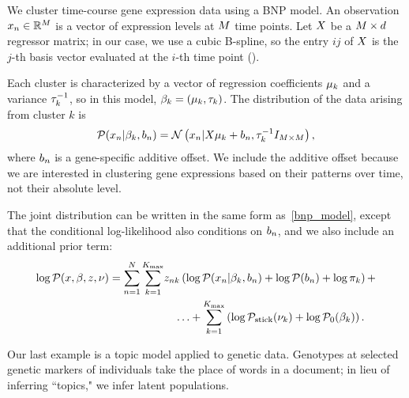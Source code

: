 \begin{ex}
We cluster time-course gene expression data using a BNP model.
An observation $x_n\in\mathbb{R}^M$ is a vector of expression levels at $M$
time points.
Let $X$ be a $M \times d$ regressor matrix;
in our case, we use a cubic B-spline, so the entry $ij$ of $X$
is the $j$-th basis vector evaluated at the $i$-th time point (\secref{}).

Each cluster is characterized by a vector of regression coefficients
$\mu_k$ and a variance $\tau^{-1}_k$, so
in this model, $\beta_k = (\mu_k, \tau_k)$.
The distribution of the data arising from cluster $k$ is
\begin{align*}
\mathcal{P}(x_n | \beta_k, b_n) =
\mathcal{N}\left(x_n | X\mu_k + b_n,
\tau_k^{-1}I_{M \times M}\right),
\end{align*}
%
where $b_{n}$ is a gene-specific additive offset.
We include the additive offset because we
are interested in clustering gene expressions based on their patterns over time,
not their absolute level.

The joint distribution can be written in the same form as~\eqref{bnp_model},
except that the conditional log-likelihood also conditions on $b_n$,
and we also include an additional prior term:
\begin{align*}
\log \mathcal{P}(x, \beta, z, \nu) =
    \sum_{n=1}^N \sum_{k=1}^{{K_{\mathrm{max}}}}&
        z_{nk} \left(
            \log \mathcal{P}(x_n \vert \beta_k, b_n) + \log \mathcal{P}(b_n) + \log \pi_k
        \right) +\notag \\
    & \quad \ldots + \sum_{k=1}^{{K_{\mathrm{max}}}} \left(
        \log \mathcal{P}_{\mathrm{stick}}(\nu_{k}) + \log \mathcal{P}_{0}(\beta_k)
    \right).
\end{align*}

\end{ex}


Our last example is a topic model applied to genetic data.
Genotypes at selected genetic markers of individuals take the place of
words in a document; in lieu of inferring ``topics," we infer latent populations.

